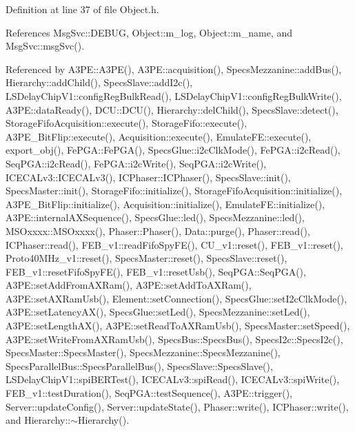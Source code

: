 Definition at line 37 of file Object.\+h.



References Msg\+Svc\+::\+D\+E\+B\+UG, Object\+::m\+\_\+log, Object\+::m\+\_\+name, and Msg\+Svc\+::msg\+Svc().



Referenced by A3\+P\+E\+::\+A3\+P\+E(), A3\+P\+E\+::acquisition(), Specs\+Mezzanine\+::add\+Bus(), Hierarchy\+::add\+Child(), Specs\+Slave\+::add\+I2c(), L\+S\+Delay\+Chip\+V1\+::config\+Reg\+Bulk\+Read(), L\+S\+Delay\+Chip\+V1\+::config\+Reg\+Bulk\+Write(), A3\+P\+E\+::data\+Ready(), D\+C\+U\+::\+D\+C\+U(), Hierarchy\+::del\+Child(), Specs\+Slave\+::detect(), Storage\+Fifo\+Acquisition\+::execute(), Storage\+Fifo\+::execute(), A3\+P\+E\+\_\+\+Bit\+Flip\+::execute(), Acquisition\+::execute(), Emulate\+F\+E\+::execute(), export\+\_\+obj(), Fe\+P\+G\+A\+::\+Fe\+P\+G\+A(), Specs\+Glue\+::i2c\+Clk\+Mode(), Fe\+P\+G\+A\+::i2c\+Read(), Seq\+P\+G\+A\+::i2c\+Read(), Fe\+P\+G\+A\+::i2c\+Write(), Seq\+P\+G\+A\+::i2c\+Write(), I\+C\+E\+C\+A\+Lv3\+::\+I\+C\+E\+C\+A\+Lv3(), I\+C\+Phaser\+::\+I\+C\+Phaser(), Specs\+Slave\+::init(), Specs\+Master\+::init(), Storage\+Fifo\+::initialize(), Storage\+Fifo\+Acquisition\+::initialize(), A3\+P\+E\+\_\+\+Bit\+Flip\+::initialize(), Acquisition\+::initialize(), Emulate\+F\+E\+::initialize(), A3\+P\+E\+::internal\+A\+X\+Sequence(), Specs\+Glue\+::led(), Specs\+Mezzanine\+::led(), M\+S\+Oxxxx\+::\+M\+S\+Oxxxx(), Phaser\+::\+Phaser(), Data\+::purge(), Phaser\+::read(), I\+C\+Phaser\+::read(), F\+E\+B\+\_\+v1\+::read\+Fifo\+Spy\+F\+E(), C\+U\+\_\+v1\+::reset(), F\+E\+B\+\_\+v1\+::reset(), Proto40\+M\+Hz\+\_\+v1\+::reset(), Specs\+Master\+::reset(), Specs\+Slave\+::reset(), F\+E\+B\+\_\+v1\+::reset\+Fifo\+Spy\+F\+E(), F\+E\+B\+\_\+v1\+::reset\+Usb(), Seq\+P\+G\+A\+::\+Seq\+P\+G\+A(), A3\+P\+E\+::set\+Add\+From\+A\+X\+Ram(), A3\+P\+E\+::set\+Add\+To\+A\+X\+Ram(), A3\+P\+E\+::set\+A\+X\+Ram\+Usb(), Element\+::set\+Connection(), Specs\+Glue\+::set\+I2c\+Clk\+Mode(), A3\+P\+E\+::set\+Latency\+A\+X(), Specs\+Glue\+::set\+Led(), Specs\+Mezzanine\+::set\+Led(), A3\+P\+E\+::set\+Length\+A\+X(), A3\+P\+E\+::set\+Read\+To\+A\+X\+Ram\+Usb(), Specs\+Master\+::set\+Speed(), A3\+P\+E\+::set\+Write\+From\+A\+X\+Ram\+Usb(), Specs\+Bus\+::\+Specs\+Bus(), Specs\+I2c\+::\+Specs\+I2c(), Specs\+Master\+::\+Specs\+Master(), Specs\+Mezzanine\+::\+Specs\+Mezzanine(), Specs\+Parallel\+Bus\+::\+Specs\+Parallel\+Bus(), Specs\+Slave\+::\+Specs\+Slave(), L\+S\+Delay\+Chip\+V1\+::spi\+B\+E\+R\+Test(), I\+C\+E\+C\+A\+Lv3\+::spi\+Read(), I\+C\+E\+C\+A\+Lv3\+::spi\+Write(), F\+E\+B\+\_\+v1\+::test\+Duration(), Seq\+P\+G\+A\+::test\+Sequence(), A3\+P\+E\+::trigger(), Server\+::update\+Config(), Server\+::update\+State(), Phaser\+::write(), I\+C\+Phaser\+::write(), and Hierarchy\+::$\sim$\+Hierarchy().



